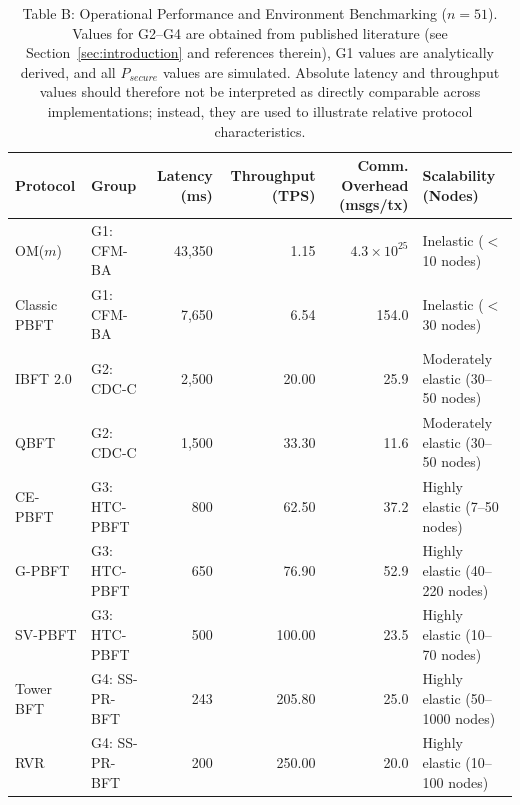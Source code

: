 \documentclass[10pt,twocolumn,journal]{IEEEtran}
\begin{document}
\begin{table}[htbp]
\caption{Table B: Operational Performance and Environment Benchmarking ($n=51$). Values for G2--G4 are obtained from published literature (see Section~\ref{sec:introduction} and references therein), G1 values are analytically derived, and all $P_{secure}$ values are simulated. Absolute latency and throughput values should therefore not be interpreted as directly comparable across implementations; instead, they are used to illustrate relative protocol characteristics.}
\label{tab:performance}
\centering
\scriptsize
\begin{tabular}{@{}llrrrl@{}}
\toprule
\textbf{Protocol} & \textbf{Group} & \textbf{Latency (ms)} & \textbf{Throughput (TPS)} & \textbf{Comm. Overhead (msgs/tx)} & \textbf{Scalability (Nodes)} \\
\midrule
OM($m$) & G1: CFM-BA & 43,350 & 1.15 & $4.3 \times 10^{25}$ & Inelastic ($<$10 nodes) \\
Classic PBFT & G1: CFM-BA & 7,650 & 6.54 & 154.0 & Inelastic ($<$30 nodes) \\
IBFT 2.0 & G2: CDC-C & 2,500 & 20.00 & 25.9 & Moderately elastic (30--50 nodes) \\
QBFT & G2: CDC-C & 1,500 & 33.30 & 11.6 & Moderately elastic (30--50 nodes) \\
CE-PBFT & G3: HTC-PBFT & 800 & 62.50 & 37.2 & Highly elastic (7--50 nodes) \\
G-PBFT & G3: HTC-PBFT & 650 & 76.90 & 52.9 & Highly elastic (40--220 nodes) \\
SV-PBFT & G3: HTC-PBFT & 500 & 100.00 & 23.5 & Highly elastic (10--70 nodes) \\
Tower BFT & G4: SS-PR-BFT & 243 & 205.80 & 25.0 & Highly elastic (50--1000 nodes) \\
RVR & G4: SS-PR-BFT & 200 & 250.00 & 20.0 & Highly elastic (10--100 nodes) \\
\bottomrule
\end{tabular}
\end{table}
\end{document}
